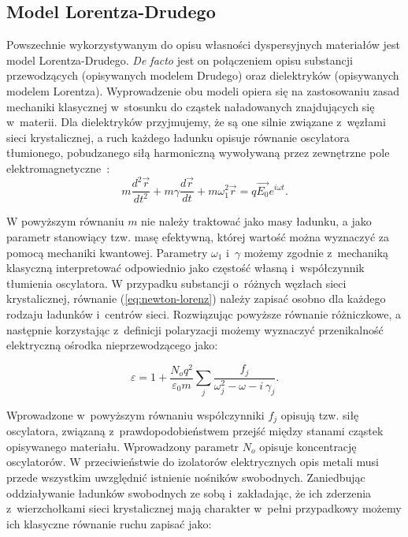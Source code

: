 \subsection{Model Lorentza-Drudego}
\label{subart:lorenz-drude}
Powszechnie wykorzystywanym do opisu własności dyspersyjnych materiałów jest model Lorentza-Drudego. \textit{De facto} jest on połączeniem opisu substancji przewodzących (opisywanych modelem Drudego) oraz dielektryków (opisywanych modelem Lorentza). Wyprowadzenie obu modeli opiera się na zastosowaniu zasad mechaniki klasycznej w~stosunku do cząstek naładowanych znajdujących się w~materii. Dla dielektryków przyjmujemy, że są one silnie związane z~węzłami sieci krystalicznej, a ruch każdego ładunku opisuje równanie oscylatora tłumionego, pobudzanego siłą harmoniczną wywoływaną przez zewnętrzne pole elektromagnetyczne~\cite{griffiths1999introduction}:
\begin{equation}
m \frac{d^2 \vec{r}}{dt^2} + m \gamma \frac{d \vec{r}}{dt} + m \omega^2_1 \vec{r} = q \vec{E_0} e^{i \omega t}.
\label{eq:newton-lorenz}
\end{equation}

W powyższym równaniu $m$ nie należy traktować jako masy ładunku, a jako parametr stanowiący tzw. masę efektywną, której wartość można wyznaczyć za pomocą mechaniki kwantowej. Parametry $\omega_1$ i~$\gamma$ możemy zgodnie z~mechaniką klasyczną interpretować odpowiednio jako częstość własną i~współczynnik tłumienia oscylatora. W przypadku substancji o~różnych węzłach sieci krystalicznej, równanie (\ref{eq:newton-lorenz}) należy zapisać osobno dla każdego rodzaju ładunków i~centrów sieci. Rozwiązując powyższe równanie różniczkowe, a następnie korzystając z~definicji polaryzacji możemy wyznaczyć przenikalność elektryczną ośrodka nieprzewodzącego jako:

\begin{equation}
\varepsilon = 1 + \frac{N_o q^2}{\varepsilon_0 m} \sum_j \frac{f_j}{\omega_j^2 - \omega - i~\gamma_j}.
\label{eq:lorenz}
\end{equation}

Wprowadzone w~powyższym równaniu współczynniki $f_j$ opisują tzw. siłę oscylatora, związaną z~prawdopodobieństwem przejść między stanami cząstek opisywanego materiału. Wprowadzony parametr $N_o$ opisuje koncentrację oscylatorów.  W przeciwieństwie do izolatorów elektrycznych opis metali musi przede wszystkim uwzględnić istnienie nośników swobodnych. Zaniedbując oddziaływanie ładunków swobodnych ze sobą i~zakładając, że ich zderzenia z~wierzchołkami sieci krystalicznej mają charakter w~pełni przypadkowy możemy ich klasyczne równanie ruchu zapisać jako:


